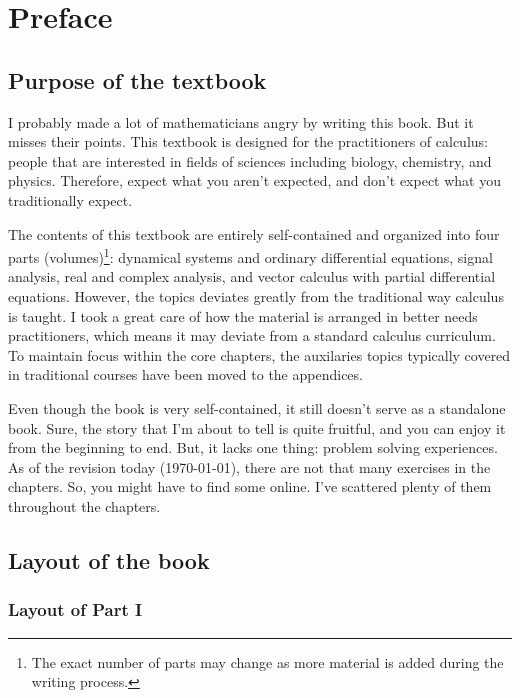 \chapter*{Preface}

\section{Purpose of the textbook}

I probably made a lot of mathematicians angry by writing this book. But it misses their points. This textbook is designed for the practitioners of calculus: people that are interested in fields of sciences including biology, chemistry, and physics. Therefore, expect what you aren't expected, and don't expect what you traditionally expect.

The contents of this textbook are entirely self-contained and organized into four parts (volumes)\footnote{The exact number of parts may change as more material is added during the writing process.}: dynamical systems and ordinary differential equations, signal analysis, real and complex analysis, and vector calculus with partial differential equations. However, the topics deviates greatly from the traditional way calculus is taught. I took a great care of how the material is arranged in better needs practitioners, which means it may deviate from a standard calculus curriculum. To maintain focus within the core chapters, the auxilaries topics typically covered in traditional courses have been moved to the appendices.

Even though the book is very self-contained, it still doesn't serve as a standalone book. Sure, the story that I'm about to tell is quite fruitful, and you can enjoy it from the beginning to end. But, it lacks one thing: problem solving experiences. As of the revision today (\today), there are not that many exercises in the chapters. So, you might have to find some online. I've scattered plenty of them throughout the chapters.

\section{Layout of the book}

\subsection{Layout of Part I}

